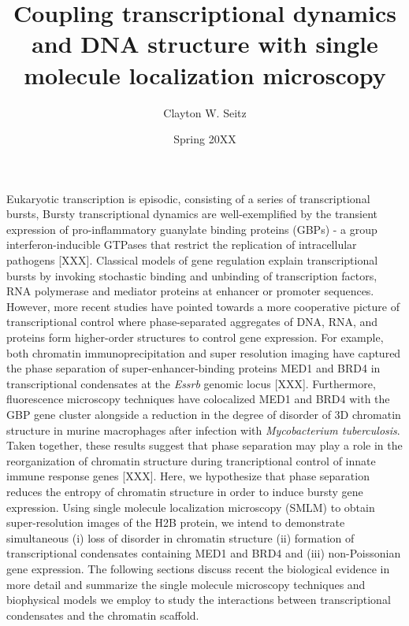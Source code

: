 \documentclass{ucetd}
\title{Coupling transcriptional dynamics and DNA structure with single molecule localization microscopy}
\author{Clayton W. Seitz}
\date{Spring 20XX}
\begin{document}
\maketitle

\makecopyright


\tableofcontents


\abstract

Eukaryotic transcription is episodic, consisting of a series of transcriptional bursts, Bursty transcriptional dynamics are well-exemplified by the transient expression of pro-inflammatory guanylate binding proteins (GBPs) - a group interferon-inducible GTPases that restrict the replication of intracellular pathogens [XXX]. Classical models of gene regulation explain transcriptional bursts by invoking stochastic binding and unbinding of transcription factors, RNA polymerase and mediator proteins at enhancer or promoter sequences. However, more recent studies have pointed towards a more cooperative picture of transcriptional control where phase-separated aggregates of DNA, RNA, and proteins form higher-order structures to control gene expression. For example, both chromatin immunoprecipitation and super resolution imaging have captured the phase separation of super-enhancer-binding proteins MED1 and BRD4 in transcriptional condensates at the \textit{Essrb} genomic locus [XXX]. Furthermore, fluorescence microscopy techniques have colocalized MED1 and BRD4 with the GBP gene cluster alongside a reduction in the degree of disorder of 3D chromatin structure in murine macrophages after infection with \textit{Mycobacterium tuberculosis}. Taken together, these results suggest that phase separation may play a role in the reorganization of chromatin structure during trancriptional control of innate immune response genes [XXX]. Here, we hypothesize that phase separation reduces the entropy of chromatin structure in order to induce bursty gene expression. Using single molecule localization microscopy (SMLM) to obtain super-resolution images of the H2B protein, we intend to demonstrate simultaneous (i) loss of disorder in chromatin structure (ii) formation of transcriptional condensates containing MED1 and BRD4 and (iii) non-Poissonian gene expression. The following sections discuss recent the biological evidence in more detail and summarize the single molecule microscopy techniques and biophysical models we employ to study the interactions between transcriptional condensates and the chromatin scaffold.
\end{document}
